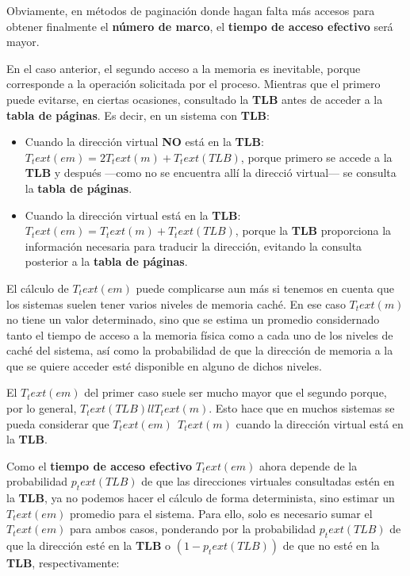 Obviamente, en métodos de paginación donde hagan falta más accesos para
obtener finalmente el \textbf{número de marco}, el \textbf{tiempo de
acceso efectivo} será mayor.

En el caso anterior, el segundo acceso a la memoria es inevitable,
porque corresponde a la operación solicitada por el proceso. Mientras
que el primero puede evitarse, en ciertas ocasiones, consultado la
\textbf{TLB} antes de acceder a la \textbf{tabla de páginas}. Es decir,
en un sistema con \textbf{TLB}:

\begin{itemize}
\item
  Cuando la dirección virtual \textbf{NO} está en la \textbf{TLB}:
  \(T_text(em)=2T_text(m) + T_text(TLB)\), porque primero se accede a la
  \textbf{TLB} y después ---como no se encuentra allí la direcció
  virtual--- se consulta la \textbf{tabla de páginas}.
\item
  Cuando la dirección virtual está en la \textbf{TLB}:
  \(T_text(em)=T_text(m) + T_text(TLB)\), porque la \textbf{TLB}
  proporciona la información necesaria para traducir la dirección,
  evitando la consulta posterior a la \textbf{tabla de páginas}.
\end{itemize}

El cálculo de \(T_text(em)\) puede complicarse aun más si tenemos en
cuenta que los sistemas suelen tener varios niveles de memoria caché. En
ese caso \(T_text(m)\) no tiene un valor determinado, sino que se estima
un promedio considernado tanto el tiempo de acceso a la memoria física
como a cada uno de los niveles de caché del sistema, así como la
probabilidad de que la dirección de memoria a la que se quiere acceder
esté disponible en alguno de dichos niveles.

El \(T_text(em)\) del primer caso suele ser mucho mayor que el segundo
porque, por lo general, \(T_text(TLB) ll T_text(m)\). Esto hace que en
muchos sistemas se pueda considerar que \(T_text(em) ~~ T_text(m)\)
cuando la dirección virtual está en la \textbf{TLB}.

Como el \textbf{tiempo de acceso efectivo} \(T_text(em)\) ahora depende
de la probabilidad \(p_text(TLB)\) de que las direcciones virtuales
consultadas estén en la \textbf{TLB}, ya no podemos hacer el cálculo de
forma determinista, sino estimar un \(T_text(em)\) promedio para el
sistema. Para ello, solo es necesario sumar el \(T_text(em)\) para ambos
casos, ponderando por la probabilidad \(p_text(TLB)\) de que la
dirección esté en la \textbf{TLB} o \((1 - p_text(TLB))\) de que no esté
en la \textbf{TLB}, respectivamente:

